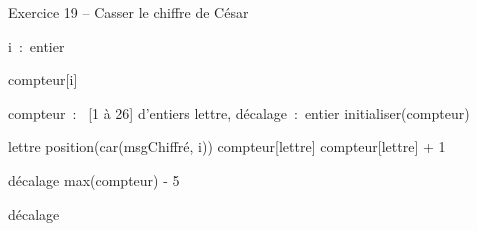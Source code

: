 \begin{Emphase}{Exercice 19 -- Casser le chiffre de César}

\begin{pseudoN}



        \Decl i~:~entier

            \Let compteur[i] 

        \EndFor

    \EndModule

   \Empty


        \Decl compteur~:~ [1 à 26] d’entiers
        \Decl lettre, décalage~:~entier
        \Decl initialiser(compteur)

            \Let lettre \Gets position(car(msgChiffré, i))
            \Let compteur[lettre] \Gets compteur[lettre] + 1 

        \EndFor

        \Let décalage \Gets max(compteur) - 5

        \Write décalage

    \EndModule

\end{pseudoN}
\end{Emphase}
    


